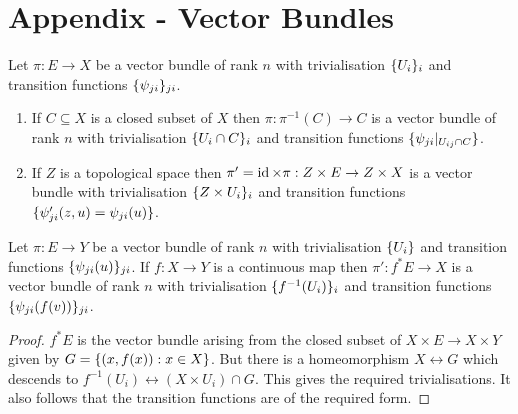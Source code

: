 \documentclass{memoir}
\begin{document}
\chapter{Appendix - Vector Bundles}
\begin{proposition}
    Let $\pi:E\to X$ be a vector bundle of rank $n$ with trivialisation $\lbrace U_i\rbrace_i$ and transition functions $\lbrace\psi_{ji}\rbrace_{ji}$.
    \begin{enumerate}
        \item If $C\subseteq X$ is a closed subset of $X$ then $\pi:\pi^{-1}(C)\to C$ is a vector bundle of rank $n$ with trivialisation $\lbrace U_i\cap C\rbrace_i$ and transition functions $\lbrace\psi_{ji}|_{U_{ij}\cap C}\rbrace$.
        \item If $Z$ is a topological space then $\pi'=\operatorname{id}\times\pi:Z\times E\to Z\times X$ is a vector bundle with trivialisation $\lbrace Z\times U_i\rbrace_i$ and transition functions $\lbrace\psi_{ji}'(z,u) = \psi_{ji}(u)\rbrace$.
    \end{enumerate}
\end{proposition}
\begin{corollary}
    Let $\pi:E\to Y$ be a vector bundle of rank $n$ with trivialisation $\lbrace U_i\rbrace$ and transition functions $\lbrace\psi_{ji}(u)\rbrace_{ji}$.
    If $f:X\to Y$ is a continuous map then $\pi':f^*E\to X$ is a vector bundle of rank $n$ with trivialisation $\lbrace f^{-1}(U_i)\rbrace_i$ and transition functions $\lbrace\psi_{ji}(f(v))\rbrace_{ji}$.
\end{corollary}
\begin{proof}
    $f^*E$ is the vector bundle arising from the closed subset of $X\times E\to X\times Y$ given by $G = \lbrace(x,f(x)):x\in X\rbrace$.
    But there is a homeomorphism $X\leftrightarrow G$ which descends to $f^{-1}(U_{i})\leftrightarrow (X\times U_{i})\cap G$.
    This gives the required trivialisations.
    It also follows that the transition functions are of the required form.
\end{proof}
\end{document}
